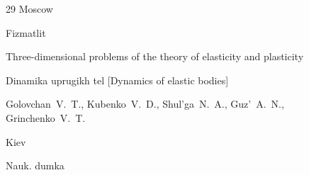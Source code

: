\begin{thebibliography}{29}
\publaddr Moscow

\publ Fizmatlit








\paper  Three-dimensional problems of the theory of elasticity and plasticity

\inbook Dinamika uprugikh tel \rm [Dynamics of elastic bodies]


\by  Golovchan~V.~T., Kubenko~V.~D., Shul'ga~N.~A., Guz'~A.~N., Grinchenko~V.~T.


\publaddr Kiev

\publ Nauk. dumka








\end{thebibliography}





\EngDate



\newpage

\Russian



%

